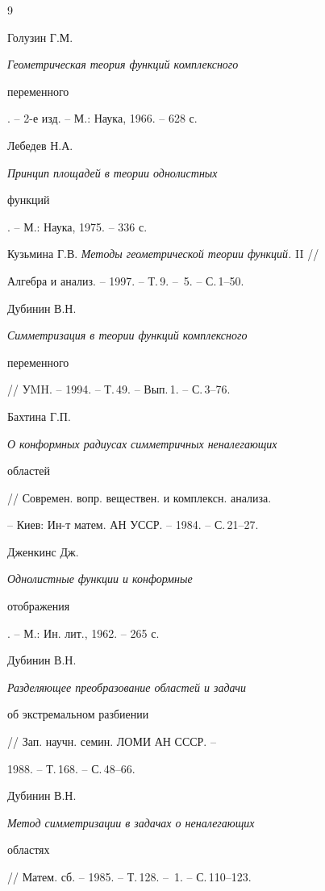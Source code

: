 \begin{thebibliography}{9}







Голузин Г.М. {\em Геометрическая теория функций комплексного


переменного}. -- 2-е изд. -- М.: Наука, 1966. -- 628 с.




Лебедев Н.А. {\em Принцип площадей в теории однолистных


функций}. -- М.: Наука, 1975. -- 336 с.




Кузьмина Г.В. {\em Методы геометрической теории функций.} II //


Алгебра и анализ. -- 1997. -- Т.\,9. -- \No\,5. -- С.\,1--50.




Дубинин В.Н. {\em Симметризация в теории функций комплексного


переменного} // УMH. -- 1994. -- Т.\,49. -- Вып.\,1. -- С.\,3--76.




Бахтина Г.П. {\em О конформных радиусах симметричных неналегающих


областей} // Современ. вопр. веществен. и комплексн. анализа.


-- Киев: Ин-т матем. АН УССР. -- 1984. -- С.\,21--27.




Дженкинс Дж. {\em Однолистные функции и конформные


отображения}. -- М.: Ин. лит., 1962. -- 265 с.




Дубинин В.Н. {\em Разделяющее преобразование областей и задачи


об экстремальном разбиении} // Зап. научн. семин. ЛОМИ АН СССР. --


1988. -- Т.\,168. -- С.\,48--66.




Дубинин В.Н. {\em Метод симметризации в задачах о неналегающих


областях} // Матем. сб. -- 1985. -- Т.\,128. -- \No\,1. -- С.\,110--123.





\end{thebibliography}





\vskip 2cm














\label{end}





